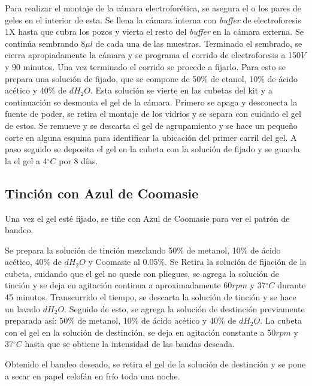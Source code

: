 \documentclass[%
 reprint,
 amsmath,amssymb,
 aps,
showkeys,
letter,
12pts
]{revtex4-1}
\begin{document}
		Para realizar el montaje de la cámara electroforética, se asegura el o los pares de geles en el interior de esta. Se llena la cámara interna con \textit{buffer} de electroforesis 1X hasta que cubra los pozos y vierta el resto del \textit{buffer} en la cámara externa. Se continúa sembrando 8$\mu l$ de cada una de las muestras. Terminado el sembrado, se cierra apropiadamente la cámara y se programa el corrido de electroforesis a 150$V$ y 90 minutos. Una vez terminado el corrido se procede a fijarlo. Para esto se prepara una solución de fijado, que se compone de 50\% de etanol, 10\% de ácido acético y 40\% de $dH_2O$. Esta solución se vierte en las cubetas del kit y a continuación se desmonta el gel de la cámara. Primero se apaga y desconecta la fuente de poder, se retira el montaje de los vidrios y se separa con cuidado el gel de estos. Se remueve y se descarta el gel de agrupamiento y se hace un pequeño corte en alguna esquina para identificar la ubicación del primer carril del gel. A paso seguido se deposita el gel en la cubeta con la solución de fijado y se guarda la el gel a 4$^{\circ}C$ por 8 días.

		
	\subsection{\label{sec:TinMet}Tinción con Azul de Coomasie}	
		Una vez el gel esté fijado, se tiñe con Azul de Coomasie para ver el patrón de bandeo.
		
		Se prepara la solución de tinción mezclando 50\% de metanol, 10\% de ácido acético, 40\% de $dH_2O$ y Coomasie al 0.05\%. Se Retira la solución de fijación de la cubeta, cuidando que el gel no quede con pliegues, se agrega la solución de tinción y se deja en agitación continua a aproximadamente 60$rpm$ y 37$^{\circ}C$ durante 45 minutos. Transcurrido el tiempo, se descarta la solución de tinción y se hace un lavado $dH_2O$. Seguido de esto, se agrega la solución de destinción previamente preparada así: 50\% de metanol, 10\% de ácido acético y 40\% de $dH_2O$. La cubeta con el gel en la solución de destinción, se deja en agitación constante a 50$rpm$ y 37$^{\circ}C$ hasta que se obtiene la intensidad de las bandas deseada.
		
		Obtenido el bandeo deseado, se retira el gel de la solución de destinción y se pone a secar en papel celofán en frío toda una noche.
		
\end{document}
